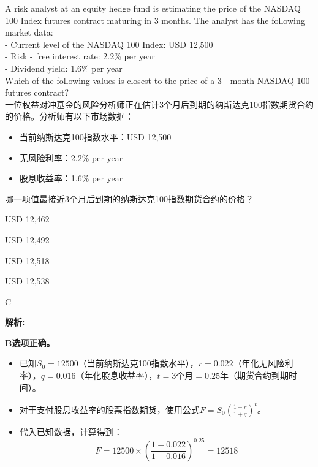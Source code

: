 \documentclass{article}
\newcounter{question} %
\newenvironment{explanation}
{\textbf{解析:}\par}
{\par}
\begin{document}
\begin{question}
    A risk analyst at an equity hedge fund is estimating the price of the NASDAQ 100 Index futures contract maturing in 3 months. The analyst has the following market data:\\
    - Current level of the NASDAQ 100 Index: USD 12,500\\
    - Risk - free interest rate: 2.2\% per year\\
    - Dividend yield: 1.6\% per year\\
    Which of the following values is closest to the price of a 3 - month NASDAQ 100 futures contract?
    \\一位权益对冲基金的风险分析师正在估计3个月后到期的纳斯达克100指数期货合约的价格。分析师有以下市场数据：
    \begin{itemize}
    \item 当前纳斯达克100指数水平：USD 12,500
    \item 无风险利率：2.2\% per year
    \item 股息收益率：1.6\% per year
    \end{itemize}
    哪一项值最接近3个月后到期的纳斯达克100指数期货合约的价格？
    \end{question}
    
    \begin{choices}
        \item USD 12,462
        \item USD 12,492
        \item USD 12,518
        \item USD 12,538
    \end{choices}
    
    \begin{correctanswer}
    C
    \end{correctanswer}
    
    \begin{explanation}
    \textbf{B选项正确。}
    \begin{itemize}
    \item 已知\(S_0 = 12500\)（当前纳斯达克100指数水平），\(r = 0.022\)（年化无风险利率），\(q = 0.016\)（年化股息收益率），\(t = 3\)个月\( = 0.25\)年（期货合约到期时间）。
    \item 对于支付股息收益率的股票指数期货，使用公式\(F = S_0(\frac{1 + r}{1 + q})^t\)。
    \item 代入已知数据，计算得到：
    \[
    F = 12500 \times \left(\frac{1 + 0.022}{1 + 0.016}\right)^{0.25} =12518
    \]
    \end{itemize}
    \end{explanation}
    
\end{document}
